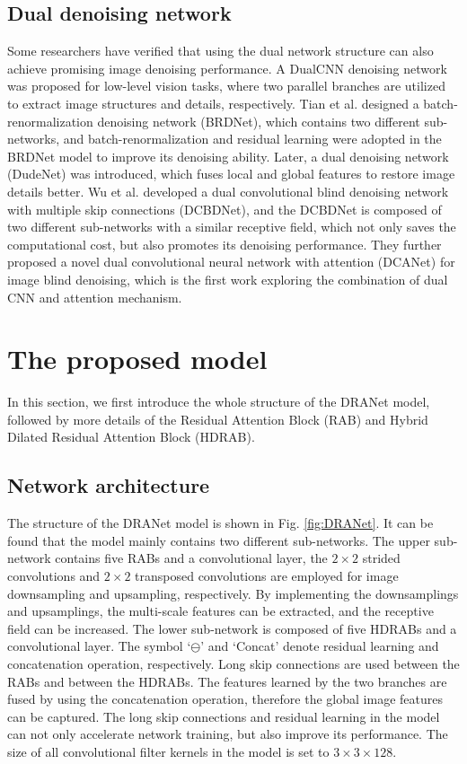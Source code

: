 \documentclass[3p,times]{elsarticle}
\begin{document}
\subsection{Dual denoising network}
Some researchers have verified that using the dual network structure can also achieve promising image denoising performance. A DualCNN \cite{Pan2018, Pan2022} denoising network was proposed for low-level vision tasks, where two parallel branches are utilized to extract image structures and details, respectively. Tian et al. \cite{Tian2020} designed a batch-renormalization denoising network (BRDNet), which contains two different sub-networks, and batch-renormalization \cite{Ioffe2017} and residual learning were adopted in the BRDNet model to improve its denoising ability. Later, a dual denoising network (DudeNet) \cite{Tian2021} was introduced, which fuses local and global features to restore image details better. Wu et al. \cite{WuS2023} developed a dual convolutional blind denoising network with multiple skip connections (DCBDNet), and the DCBDNet is composed of two different sub-networks with a similar receptive field, which not only saves the computational cost, but also promotes its denoising performance. They further proposed a novel dual convolutional neural network with attention (DCANet) \cite{WuG2023} for image blind denoising, which is the first work exploring the combination of dual CNN and attention mechanism.

\section{The proposed model}\label{Proposed_model}
In this section, we first introduce the whole structure of the DRANet model, followed by more details of the Residual Attention Block (RAB) and Hybrid Dilated Residual Attention Block (HDRAB).

\subsection{Network architecture}
The structure of the DRANet model is shown in Fig. \ref{fig:DRANet}. It can be found that the model mainly contains two different sub-networks. The upper sub-network contains five RABs and a convolutional layer, the $2 \times 2$ strided convolutions and $2 \times 2$ transposed convolutions are employed for image downsampling and upsampling, respectively. By implementing the downsamplings and upsamplings, the multi-scale features can be extracted, and the receptive field can be increased. The lower sub-network is composed of five HDRABs and a convolutional layer. The symbol `$\ominus$' and `Concat' denote residual learning and concatenation operation, respectively. Long skip connections are used between the RABs and between the HDRABs. The features learned by the two branches are fused by using the concatenation operation, therefore the global image features can be captured. The long skip connections and residual learning \cite{He2016} in the model can not only accelerate network training, but also improve its performance. The size of all convolutional filter kernels in the model is set to $3 \times 3 \times 128$.
\end{document}
